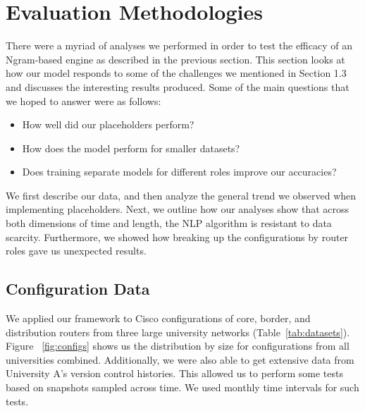 \documentclass[../thesis.tex]{subfiles}
\begin{document}
\chapter{Evaluation Methodologies}
\label{ch:experiments}

There were a myriad of analyses we performed in order to test the efficacy of an Ngram-based engine as described in the previous section. This section looks at how our model responds to some of the challenges we mentioned in Section 1.3 and discusses the interesting results produced. Some of the main questions that we hoped to answer were as follows: 
\begin{itemize}
  \item How well did our placeholders perform?
  \item How does the model perform for smaller datasets?
  \item Does training separate models for different roles improve our accuracies?
\end{itemize}

 We first describe our data, and then analyze the general trend we observed when implementing placeholders. Next, we outline how our analyses show that across both dimensions of time and length, the NLP algorithm is resistant to data scarcity. Furthermore, we showed how breaking up the configurations by router roles gave us unexpected results.

\section{Configuration Data}

We applied our framework to Cisco configurations of core, border, and distribution routers from three large university networks (Table~\ref{tab:datasets}). Figure ~\ref{fig:configs} shows us the distribution by size for configurations from all universities combined. Additionally, we were also able to get extensive data from University A's version control histories. This allowed us to perform some tests based on snapshots sampled across time. We used monthly time intervals for such tests.
\end{document}
